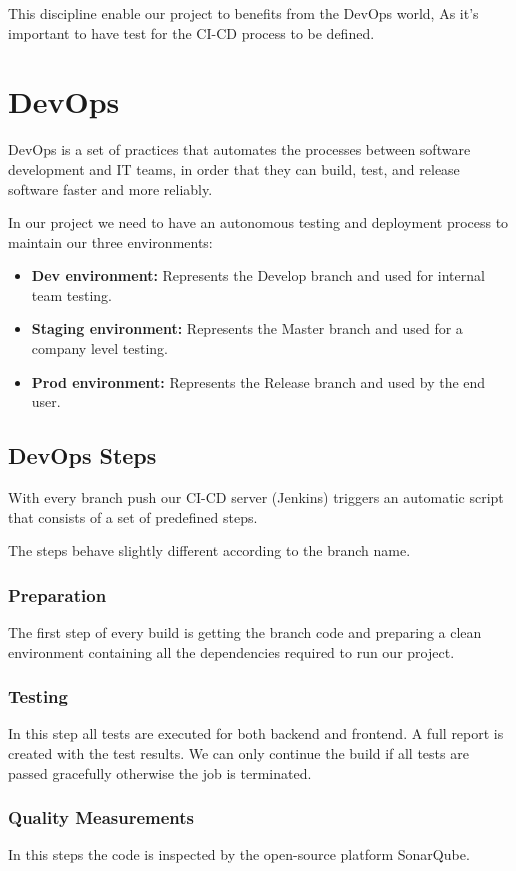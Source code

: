 \begin{spacing}{1.2}
This discipline enable our project to benefits from the DevOps world, As it's important to have test for the CI-CD process to be defined.  


\section{DevOps}
DevOps is a set of practices that automates the processes between software development and IT teams, in order that they can build, test, and release software faster and more reliably. 

In our project we need to have an autonomous testing and deployment process to maintain our three environments: 
\begin{itemize}
	\item \textbf{Dev environment:} Represents the Develop branch and used for internal team testing.
	\item \textbf{Staging environment:} Represents the Master branch and used for a company level testing.
    \item \textbf{Prod environment:} Represents the Release branch and used by the end user.
\end{itemize}

\subsection{DevOps Steps}
With every branch push our CI-CD server (Jenkins) triggers an automatic script that consists of a set of predefined steps.

The steps behave slightly different according to the branch name.
\subsubsection{Preparation}
The first step of every build is getting the branch code and preparing a clean environment containing all the dependencies required to run our project. 
\subsubsection{Testing}
In this step all tests are executed for both backend and frontend. A full report is created with the test results.
We can only continue the build if all tests are passed gracefully otherwise the job is terminated. 
\subsubsection{Quality Measurements}
In this steps the code is inspected by the open-source platform SonarQube.


\end{spacing}
